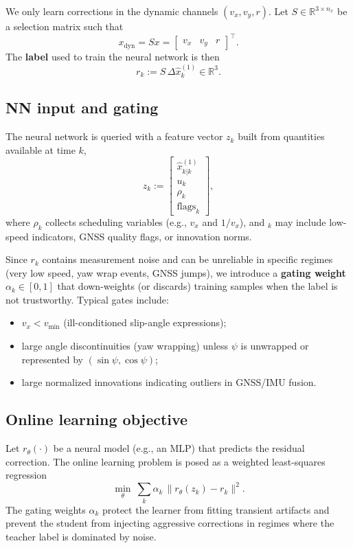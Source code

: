 We only learn corrections in the dynamic channels $(v_x,v_y,r)$. Let $S\in\mathbb{R}^{3\times n_x}$ be a selection matrix such that
\begin{equation}
    x_{\text{dyn}} = Sx = \begin{bmatrix} v_x & v_y & r \end{bmatrix}^{\top}.
\end{equation}
The \textbf{label} used to train the neural network is then
\begin{equation}\label{eq:ch4_label_def}
    r_k := S\,\Delta \hat x^{(1)}_{k} \in \mathbb{R}^{3}.
\end{equation}

\subsection{NN input and gating}\label{ch4_subsec_gating}
The neural network is queried with a feature vector $z_k$ built from quantities available at time $k$,
\begin{equation}\label{eq:ch4_features}
    z_k := \begin{bmatrix}
        \hat x^{(1)}_{k|k} \\ u_k \\ \rho_k \\ \text{flags}_k
    \end{bmatrix},
\end{equation}
where $\rho_k$ collects scheduling variables (e.g., $v_x$ and $1/v_x$), and $_k$ may include low-speed indicators, GNSS quality flags, or innovation norms.

Since $r_k$ contains measurement noise and can be unreliable in specific regimes (very low speed, yaw wrap events, GNSS jumps), we introduce a \textbf{gating weight} $\alpha_k\in[0,1]$ that down-weights (or discards) training samples when the label is not trustworthy. Typical gates include:
\begin{itemize}
    \item $v_x < v_{\min}$ (ill-conditioned slip-angle expressions);
    \item large angle discontinuities (yaw wrapping) unless $\psi$ is unwrapped or represented by $(\sin\psi,\cos\psi)$;
    \item large normalized innovations indicating outliers in GNSS/IMU fusion.
\end{itemize}

\subsection{Online learning objective}\label{ch4_subsec_learning_objective}
Let $r_\theta(\cdot)$ be a neural model (e.g., an MLP) that predicts the residual correction. The online learning problem is posed as a weighted least-squares regression
\begin{equation}\label{eq:ch4_nn_loss}
    \min_{\theta}\ \sum_{k} \alpha_k\,\big\|r_\theta(z_k) - r_k\big\|^2.
\end{equation}
The gating weights $\alpha_k$ protect the learner from fitting transient artifacts and prevent the student from injecting aggressive corrections in regimes where the teacher label is dominated by noise.

